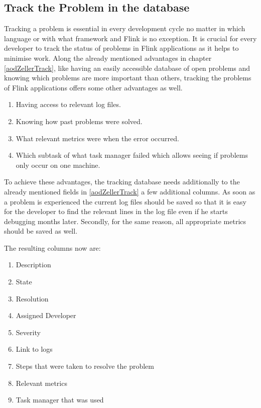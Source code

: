 \subsection{Track the Problem in the database}
Tracking a problem is essential in every development cycle no matter in which language or with what framework and Flink is no exception. It is crucial for every developer to track the status of problems in Flink applications as it helps to minimise work. Along the already mentioned advantages in chapter \ref{aodZellerTrack}, like having an easily accessible database of open problems and knowing which problems are more important than others, tracking the problems of Flink applications offers some other advantages as well.

\begin{enumerate}
  \item Having access to relevant log files.
  \item Knowing how past problems were solved.
  \item What relevant metrics were when the error occurred.
  \item Which subtask of what task manager failed which allows seeing if problems only occur on one machine.
\end{enumerate}

To achieve these advantages, the tracking database needs additionally to the already mentioned fields in \ref{aodZellerTrack} a few additional columns. As soon as a problem is experienced the current log files should be saved so that it is easy for the developer to find the relevant lines in the log file even if he starts debugging months later. Secondly, for the same reason, all appropriate metrics should be saved as well.

The resulting columns now are:

\begin{enumerate}
  \item Description
  \item State
  \item Resolution
  \item Assigned Developer
  \item Severity
  \item Link to logs
  \item Steps that were taken to resolve the problem
  \item Relevant metrics
  \item Task manager that was used
\end{enumerate}

